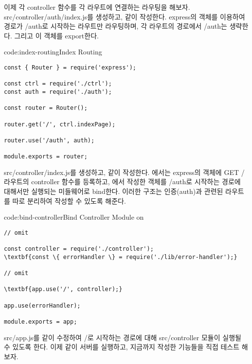 이제 각 controller 함수를 각 라우트에 연결하는 라우팅을 해보자. src/controller/auth/index.js를 생성하고, \과 같이 작성한다. \은 express의  객체를 이용하여 경로가 /auth로 시작하는 라우트만 라우팅하며, 각 라우트의 경로에서 /auth는 생략한다. 그리고 이  객체를 export한다.

\begin{codeenv}{code:index-routing}{Index Routing}\begin{verbatim}
const { Router } = require('express');

const ctrl = require('./ctrl');
const auth = require('./auth');

const router = Router();

router.get('/', ctrl.indexPage);

router.use('/auth', auth);

module.exports = router;
\end{verbatim}
\end{codeenv}

src/controller/index.js를 생성하고, \과 같이 작성한다. 에서는 express의  객체에 GET / 라우트의 controller 함수를 등록하고, 에서 작성한  객체를 /auth로 시작하는 경로에 대해서만 실행되는 미들웨어로 bind한다. 이러한 구조는 인증(auth)과 관련된 라우트를 따로 분리하여 작성할 수 있도록 해준다.

\begin{codeenv}{code:bind-controller}{Bind Controller Module on }
\begin{Verbatim}[commandchars=\\\{\}]
// omit

const controller = require('./controller');
\textbf{const \{ errorHandler \} = require('./lib/error-handler');}

// omit

\textbf{app.use('/', controller);}

app.use(errorHandler);

module.exports = app;
\end{Verbatim}
\end{codeenv}

src/app.js를 \와 같이 수정하여 /로 시작하는 경로에 대해 src/controller 모듈이 실행될 수 있도록 한다. 이제 \와 같이 서버를 실행하고, 지금까지 작성한 기능들을 직접 테스트 해보자.
\newpage

